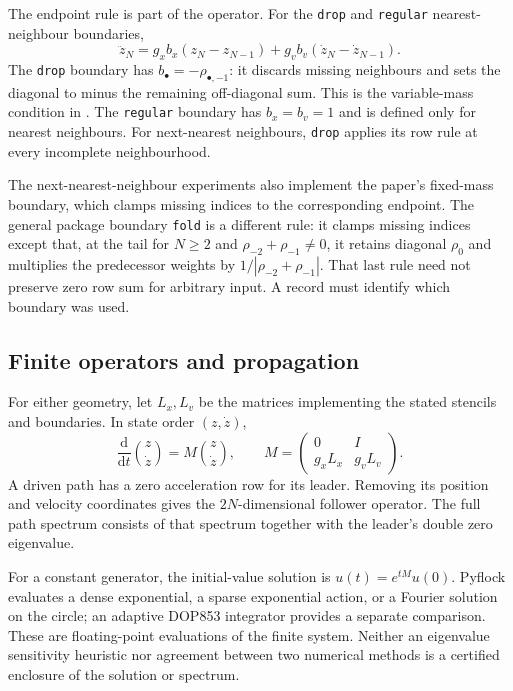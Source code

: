 \documentclass[11pt]{article}
\newcommand{\dd}{\mathrm d}
\begin{document}
The endpoint rule is part of the operator. For the \texttt{drop} and
\texttt{regular} nearest-neighbour boundaries,
\begin{equation}\label{eq:tail}
 \ddot z_N=g_x b_x(z_N-z_{N-1})
          +g_v b_v(\dot z_N-\dot z_{N-1}).
\end{equation}
The \texttt{drop} boundary has $b_\bullet=-\rho_{\bullet,-1}$:
it discards missing neighbours and sets the diagonal to minus the
remaining off-diagonal sum. This is the variable-mass condition in
\cite[Definition 1]{transients}. The \texttt{regular} boundary has
$b_x=b_v=1$ and is defined only for nearest neighbours.
For next-nearest neighbours, \texttt{drop} applies its row rule at every
incomplete neighbourhood.

The next-nearest-neighbour experiments also implement the paper's fixed-mass
boundary, which clamps missing indices to the corresponding endpoint.
The general package boundary \texttt{fold} is a different rule:
it clamps missing indices except that, at the tail for $N\geq2$ and
$\rho_{-2}+\rho_{-1}\neq0$, it retains diagonal $\rho_0$ and multiplies
the predecessor weights by $1/|\rho_{-2}+\rho_{-1}|$.
That last rule need not preserve zero row sum for arbitrary input.
A record must identify which boundary was used.

\subsection{Finite operators and propagation}

For either geometry, let $L_x,L_v$ be the matrices implementing the stated
stencils and boundaries. In state order $(z,\dot z)$,
\begin{equation}\label{eq:matrix}
 \frac{\dd}{\dd t}\binom z{\dot z}
 =M\binom z{\dot z},\qquad
 M=\begin{pmatrix}0&I\\g_xL_x&g_vL_v\end{pmatrix}.
\end{equation}
A driven path has a zero acceleration row for its leader.
Removing its position and velocity coordinates gives the $2N$-dimensional
follower operator. The full path spectrum consists of that spectrum
together with the leader's double zero eigenvalue.

For a constant generator, the initial-value solution is
$u(t)=e^{tM}u(0)$. Pyflock evaluates a dense exponential, a sparse
exponential action, or a Fourier solution on the circle; an adaptive
DOP853 integrator provides a separate comparison.
These are floating-point evaluations of the finite system.
Neither an eigenvalue sensitivity heuristic nor agreement between two
numerical methods is a certified enclosure of the solution or spectrum.
\end{document}
